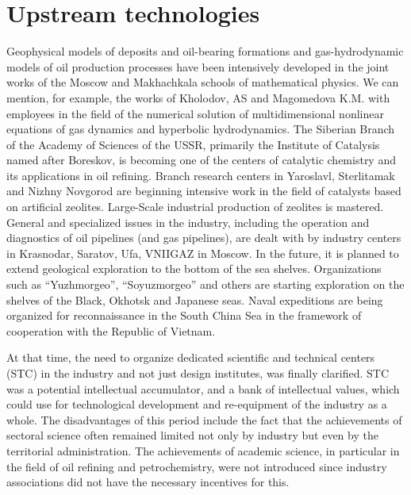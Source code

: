 \documentclass[12pt]{report}
\theoremstyle{definition}
\begin{document}
\section{Upstream technologies}
Geophysical models of deposits and oil-bearing formations and gas-hydrodynamic models of oil production processes have been intensively developed in the joint works of the Moscow and Makhachkala schools of mathematical physics.
We can mention, for example, the works of Kholodov, AS and Magomedova K.M. with employees in the field of the numerical solution of multidimensional nonlinear equations of gas dynamics and hyperbolic hydrodynamics.
The Siberian Branch of the Academy of Sciences of the USSR, primarily the Institute of Catalysis named after Boreskov, is becoming one of the centers of catalytic chemistry and its applications in oil refining.
Branch research centers in Yaroslavl, Sterlitamak and Nizhny Novgorod are beginning intensive work in the field of catalysts based on artificial zeolites.
Large-Scale industrial production of zeolites is mastered.
General and specialized issues in the industry, including the operation and diagnostics of oil pipelines (and gas pipelines), are dealt with by industry centers in Krasnodar, Saratov, Ufa, VNIIGAZ in Moscow.
In the future, it is planned to extend geological exploration to the bottom of the sea shelves.
Organizations such as ``Yuzhmorgeo'', ``Soyuzmorgeo'' and others are starting exploration on the shelves of the Black, Okhotsk and Japanese seas.
Naval expeditions are being organized for reconnaissance in the South China Sea in the framework of cooperation with the Republic of Vietnam.

At that time, the need to organize dedicated scientific and technical centers (STC) in the industry and not just design institutes, was finally clarified.
STC was a potential intellectual accumulator, and a bank of intellectual values, which could use for technological development and re-equipment of the industry as a whole.
The disadvantages of this period include the fact that the achievements of sectoral science often remained limited not only by industry but even by the territorial administration.
The achievements of academic science, in particular in the field of oil refining and petrochemistry, were not introduced since industry associations did not have the necessary incentives for this.
\end{document}
